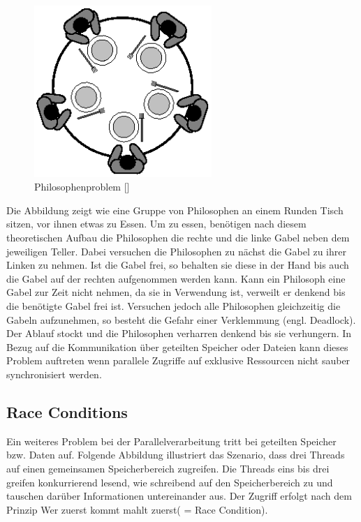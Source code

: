 \documentclass[12pt,oneside,a4paper,bibtotoc,liststotoc]{scrreprt}
\begin{document}
\begin{figure}[H]
  \begin{centering}
    \includegraphics[width=0.6\textwidth]{img/PhilosophenProblem.png}
    \caption{Philosophenproblem [\citet{philosofen}]}
    \label{Philosophenproblem}
  \end{centering}
\end{figure}
Die Abbildung zeigt wie eine Gruppe von Philosophen an einem Runden Tisch sitzen, vor ihnen etwas zu Essen. Um zu essen, benötigen nach diesem theoretischen Aufbau die Philosophen die rechte und die linke Gabel neben dem jeweiligen Teller. Dabei versuchen die Philosophen zu nächst die Gabel zu ihrer Linken zu nehmen. Ist die Gabel frei, so behalten sie diese in der Hand bis auch die Gabel auf der rechten aufgenommen werden kann. Kann ein Philosoph eine Gabel zur Zeit nicht nehmen, da sie in Verwendung ist, verweilt er denkend bis die benötigte Gabel frei ist. Versuchen jedoch alle Philosophen gleichzeitig die Gabeln aufzunehmen, so besteht die Gefahr einer Verklemmung (engl. Deadlock). Der Ablauf stockt und die Philosophen verharren denkend bis sie verhungern. In Bezug auf die Kommunikation über geteilten Speicher oder Dateien kann dieses Problem auftreten wenn parallele Zugriffe auf exklusive Ressourcen nicht sauber synchronisiert werden.



\subsection{Race Conditions}
Ein weiteres Problem bei der Parallelverarbeitung tritt bei geteilten Speicher bzw. Daten auf. Folgende Abbildung illustriert das Szenario, dass drei Threads auf einen gemeinsamen Speicherbereich zugreifen. Die Threads eins bis drei greifen konkurrierend lesend, wie schreibend auf den Speicherbereich zu und tauschen darüber Informationen untereinander aus. Der Zugriff erfolgt nach dem Prinzip \glqq Wer zuerst kommt mahlt zuerst\grqq  ( = Race Condition).
\end{document}
